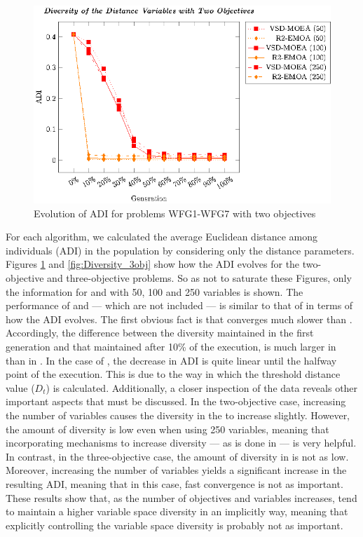 \begin{figure}[t]
\centering
\includegraphics[scale=0.85]{Images/Graphic-Diversity_2obj_tikz-figure1.eps}
\caption{Evolution of ADI for problems WFG1-WFG7 with two objectives}\label{fig:Diversity_2obj}
\end{figure}

For each algorithm, we calculated the average Euclidean distance among individuals (ADI) in the population by considering only 
the distance parameters.
%
Figures \ref{fig:Diversity_2obj} and \ref{fig:Diversity_3obj} show how the ADI evolves for the two-objective and three-objective problems.
%
So as not to saturate these Figures, only the information for \VSDMOEA{} and \RMOEA{} with 50, 100 and 250 variables is shown.
%
The performance of \NSGAII{} and \MOEAD{} --- which are not included --- is similar to that of \RMOEA{} in terms of how the ADI evolves. 
%
The first obvious fact is that \VSDMOEA{} converges much slower than \RMOEA{}.
%
Accordingly, the difference between the diversity maintained in the first generation and that maintained after 10\% of the execution,
is much larger in \RMOEA{} than in \VSDMOEA{}.
%
In the case of \VSDMOEA{}, the decrease in ADI is quite linear until the halfway point of the execution.
%
This is due to the way in which the threshold distance value ($D_t$) is calculated.
%
Additionally, a closer inspection of the data reveals other important aspects that must be discussed. 
%
In the two-objective case, increasing the number of variables causes the diversity in the \RMOEA{} to increase slightly.
%
However, the amount of diversity is low even when using 250 variables, meaning that incorporating mechanisms to increase diversity --- as is done in \VSDMOEA{} ---
is very helpful.
%
In contrast, in the three-objective case, the amount of diversity in \RMOEA{} is not as low.
%
Moreover, increasing the number of variables yields a significant increase in the resulting ADI, meaning that in this case,
fast convergence is not as important.
%
These results show that, as the number of objectives and variables increases, \MOEAS{} tend to maintain a higher variable space diversity
in an implicitly way, meaning that explicitly controlling the variable space diversity is probably not as important.
%

